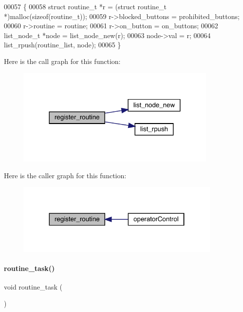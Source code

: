 \begin{DoxyCode}
00057                                                     \{
00058   \textcolor{keyword}{struct }routine_t *r = (\textcolor{keyword}{struct }routine_t *)malloc(\textcolor{keyword}{sizeof}(routine_t));
00059   r->blocked_buttons = prohibited\_buttons;
00060   r->routine = routine;
00061   r->on_button = on\_buttons;
00062   list_node_t *node = list_node_new(r);
00063   node->val = r;
00064   list_rpush(routine_list, node);
00065 \}
\end{DoxyCode}
Here is the call graph for this function\+:
\nopagebreak
\begin{figure}[H]
\begin{center}
\leavevmode
\includegraphics[width=281pt]{routines_8c_a9486ebd51b8c3d966619cf4617e6a930_cgraph}
\end{center}
\end{figure}
Here is the caller graph for this function\+:
\nopagebreak
\begin{figure}[H]
\begin{center}
\leavevmode
\includegraphics[width=287pt]{routines_8c_a9486ebd51b8c3d966619cf4617e6a930_icgraph}
\end{center}
\end{figure}
\mbox{\label{routines_8c_a230cdcefb410a429fb6baba1f88fc9ba}} 
\paragraph{routine\+\_\+task()}
{\footnotesize\ttfamily void routine\+\_\+task (\begin{DoxyParamCaption}{ }\end{DoxyParamCaption})}




